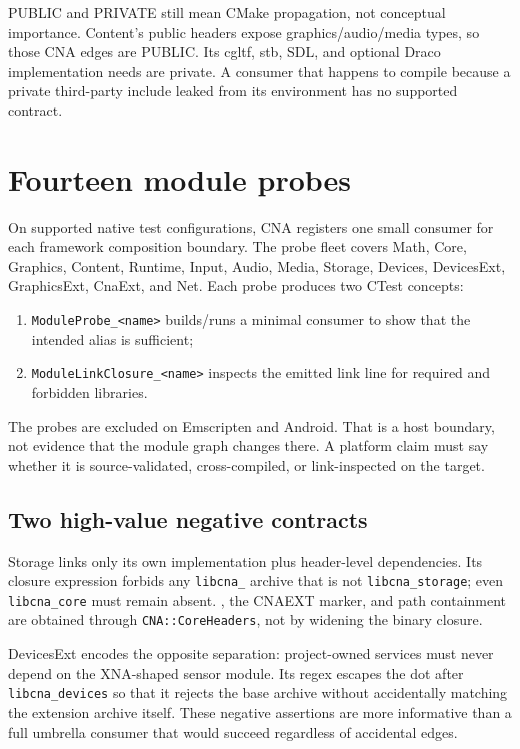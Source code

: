 PUBLIC and PRIVATE still mean CMake propagation, not conceptual importance.  Content's public
headers expose graphics/audio/media types, so those CNA edges are PUBLIC.  Its cgltf, stb, SDL, and
optional Draco implementation needs are private.  A consumer that happens to compile because a
private third-party include leaked from its environment has no supported contract.

\section{Fourteen module probes}

On supported native test configurations, CNA registers one small consumer for each framework
composition boundary.  The probe fleet covers Math, Core, Graphics, Content, Runtime, Input, Audio,
Media, Storage, Devices, DevicesExt, GraphicsExt, CnaExt, and Net.  Each probe produces two CTest
concepts:

\begin{enumerate}
  \item \texttt{ModuleProbe\_<name>} builds/runs a minimal consumer to show that the intended alias
        is sufficient;
  \item \texttt{ModuleLinkClosure\_<name>} inspects the emitted link line for required and forbidden
        libraries.
\end{enumerate}

The probes are excluded on Emscripten and Android.  That is a host boundary, not evidence that the
module graph changes there.  A platform claim must say whether it is source-validated,
cross-compiled, or link-inspected on the target.

\subsection{Two high-value negative contracts}

Storage links only its own implementation plus header-level dependencies.  Its closure expression
forbids any \texttt{libcna\_} archive that is not \texttt{libcna\_storage}; even
\texttt{libcna\_core} must remain absent.  , the CNAEXT marker, and path
containment are obtained through \texttt{CNA::}\allowbreak\texttt{CoreHeaders}, not by widening
the binary closure.

DevicesExt encodes the opposite separation: project-owned  services must never
depend on the XNA-shaped  sensor module.  Its regex escapes the dot after
\texttt{libcna\_devices} so that it rejects the base archive without accidentally matching
the extension archive itself.  These negative assertions are more informative than a full
umbrella consumer that would succeed regardless of accidental edges.

